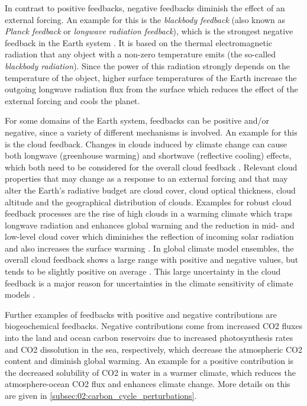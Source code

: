 In contrast to positive feedbacks, negative feedbacks diminish the effect of an
external forcing. An example for this is the \emph{blackbody feedback} (also
known as \emph{Planck feedback} or \emph{longwave radiation feedback}), which
is the strongest negative feedback in the Earth system \autocite{Cubasch2013}.
It is based on the thermal electromagnetic radiation that any object with a
non-zero temperature emits (the so-called \emph{blackbody radiation}). Since
the power of this radiation strongly depends on the temperature of the object,
higher surface temperatures of the Earth increase the outgoing longwave
radiation flux from the surface which reduces the effect of the external
forcing and cools the planet.

For some domains of the Earth system, feedbacks can be positive and/or
negative, since a variety of different mechanisms is involved. An example for
this is the cloud feedback. Changes in clouds induced by climate change can
cause both longwave (greenhouse warming) and shortwave (reflective cooling)
effects, which both need to be considered for the overall cloud feedback
\autocite{Boucher2013}. Relevant cloud properties that may change as a response
to an external forcing and that may alter the Earth's radiative budget are
cloud cover, cloud optical thickness, cloud altitude and the geographical
distribution of clouds. Examples for robust cloud feedback processes are the
rise of high clouds in a warming climate which traps longwave radiation and
enhances global warming and the reduction in mid- and low-level cloud cover
which diminishes the reflection of incoming solar radiation and also increases
the surface warming \autocite{Boucher2013}. In global climate model ensembles,
the overall cloud feedback shows a large range with positive and negative
values, but tends to be slightly positive on average \autocite{Soden2006,
  Dufresne2008, Vial2013, Zelinka2020}. This large uncertainty in the cloud
feedback is a major reason for uncertainties in the climate sensitivity of
climate models \autocite{Boucher2013, Flato2013}.

Further examples of feedbacks with positive and negative contributions are
biogeochemical feedbacks. Negative contributions come from increased \ac{CO2}
fluxes into the land and ocean carbon reservoirs due to increased
photosynthesis rates and \ac{CO2} dissolution in the sea, respectively, which
decrease the atmospheric \ac{CO2} content and diminish global warming. An
example for a positive contribution is the decreased solubility of \ac{CO2} in
water in a warmer climate, which reduces the atmosphere-ocean \ac{CO2} flux and
enhances climate change. More details on this are given in
\cref{subsec:02:carbon_cycle_perturbations}.


